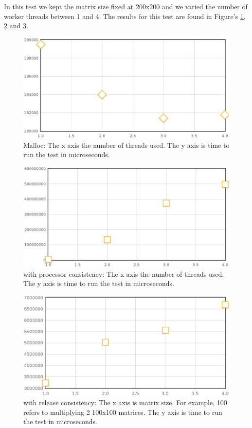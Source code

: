In this test we kept the matrix size fixed at 200x200 and we varied the number of worker threads between 1 and 4. The results for this test are found in Figure's \ref{malloc-fixed-matrix}, \ref{hoard-pc-fixed-matrix} and \ref{hoard-rc-fixed-matrix}.

\begin{figure}[!h]
\centering
\includegraphics[scale=0.40]{images/malloc-fixed-matrix.eps}
\caption{Malloc: The x axis the number of threads used. The y axis is time to run the test in microseconds.}
\label{malloc-fixed-matrix}
\end{figure}

\begin{figure}[!h]
\centering
\includegraphics[scale=0.40]{images/mmult-lh-fixed-size.eps}
\caption{\projname{} with processor consistency: The x axis the number of threads used. The y axis is time to run the test in microseconds.}
\label{hoard-pc-fixed-matrix}
\end{figure}

\begin{figure}[!h]
\centering
\includegraphics[scale=0.40]{images/mmlh-fixed-size.eps}
\caption{\projname{} with release consistency: The x axis is matrix size. For example, 100 refers to multiplying 2 100x100 matrices. The y axis is time to run the test in microseconds.}
\label{hoard-rc-fixed-matrix}
\end{figure}

